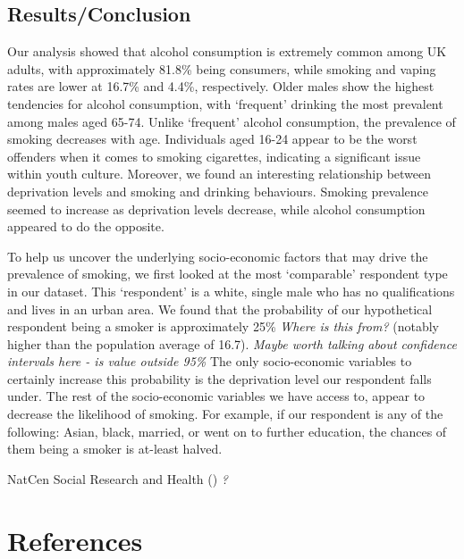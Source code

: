 \documentclass[
  11pt,
]{article}
\begin{document}
\subsection{Results/Conclusion}\label{resultsconclusion}

Our analysis showed that alcohol consumption is extremely common among
UK adults, with approximately 81.8\% being consumers, while smoking and
vaping rates are lower at 16.7\% and 4.4\%, respectively. Older males
show the highest tendencies for alcohol consumption, with `frequent'
drinking the most prevalent among males aged 65-74. Unlike `frequent'
alcohol consumption, the prevalence of smoking decreases with age.
Individuals aged 16-24 appear to be the worst offenders when it comes to
smoking cigarettes, indicating a significant issue within youth culture.
Moreover, we found an interesting relationship between deprivation
levels and smoking and drinking behaviours. Smoking prevalence seemed to
increase as deprivation levels decrease, while alcohol consumption
appeared to do the opposite.

To help us uncover the underlying socio-economic factors that may drive
the prevalence of smoking, we first looked at the most `comparable'
respondent type in our dataset. This `respondent' is a white, single
male who has no qualifications and lives in an urban area. We found that
the probability of our hypothetical respondent being a smoker is
approximately 25\% \emph{Where is this from?} (notably higher than the
population average of 16.7). \emph{Maybe worth talking about confidence
intervals here - is value outside 95\%} The only socio-economic
variables to certainly increase this probability is the deprivation
level our respondent falls under. The rest of the socio-economic
variables we have access to, appear to decrease the likelihood of
smoking. For example, if our respondent is any of the following: Asian,
black, married, or went on to further education, the chances of them
being a smoker is at-least halved.

NatCen Social Research and Health () \emph{?}

\newpage

\section*{References}\label{references}
\end{document}
